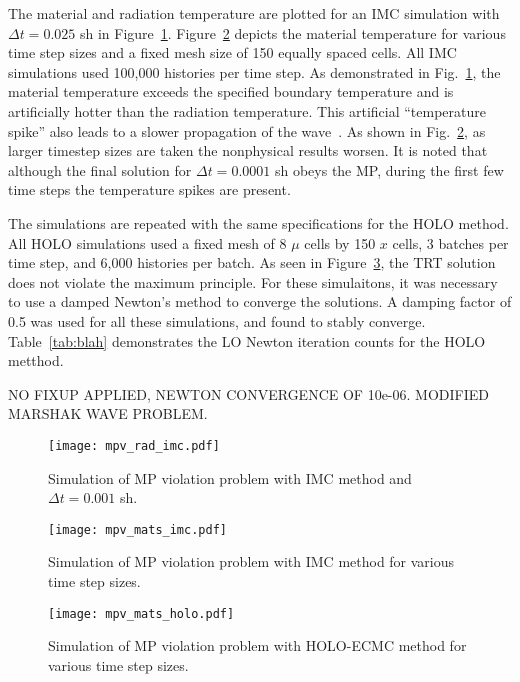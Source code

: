 The material and radiation temperature are plotted for an IMC simulation with $\Delta
t=0.025$ sh in
Figure~\ref{fig:imc_mpvrad}.  Figure~\ref{fig:imc_mpv} depicts the material temperature
for various time step sizes and a fixed mesh size of 150 equally spaced cells.     All IMC
simulations used 100,000 histories per time step. As demonstrated in
Fig.~\ref{fig:imc_mpvrad}, the material temperature exceeds the specified boundary
temperature and is artificially hotter than the radiation temperature.  This artificial
``temperature spike'' also leads to a slower propagation of the
wave~\cite{wollaber2013discrete}.  As shown in
Fig.~\ref{fig:imc_mpv}, as larger timestep sizes are taken the nonphysical results worsen.
It is noted that although the final solution for $\Delta t=0.0001$ sh obeys the MP, during
the first few time steps the temperature spikes are present.

The simulations are repeated with the same specifications for the HOLO method. All HOLO
simulations used a fixed mesh of 8 $\mu$ cells by 150 $x$ cells, 3 batches per time step,
and 6,000 histories per batch.  As seen in
Figure~\ref{fig:holo_mpv}, the TRT solution does not violate the maximum principle.
For these simulaitons, it was
necessary to use a damped Newton's method to converge the solutions.  A damping factor of
0.5 was used for all these simulations, and found to stably converge.
Table~\ref{tab:blah} demonstrates the LO Newton iteration counts for the HOLO metthod.





NO FIXUP APPLIED, NEWTON CONVERGENCE OF 10e-06.  MODIFIED MARSHAK WAVE PROBLEM.


\begin{figure}[H]
    \centering
    \texttt{[image: mpv\_rad\_imc.pdf]}
    \caption{\label{fig:imc_mpvrad}Simulation of MP violation problem with IMC method and $\Delta t = 0.001$ sh.}
\end{figure}

\begin{figure}[H]
    \centering
    \texttt{[image: mpv\_mats\_imc.pdf]}
    \caption{\label{fig:imc_mpv}Simulation of MP violation problem with IMC method for various time step
    sizes.}
\end{figure}

\begin{figure}[H]
    \centering
    \texttt{[image: mpv\_mats\_holo.pdf]}
    \caption{\label{fig:holo_mpv}Simulation of MP violation problem with HOLO-ECMC method for various time step
    sizes.}
\end{figure}



